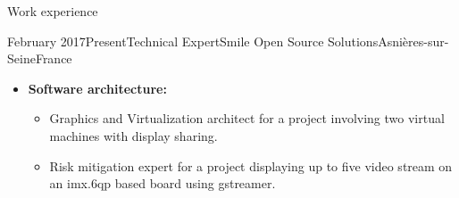 \documentclass[a4paper, 10pt]{article}
\begin{document}
\begin{section} {Work experience}
    \begin{experience}{February 2017}{Present}{Technical Expert}{Smile Open Source Solutions}{Asni\`{e}res-sur-Seine}{France}
    \begin{subexperience}
    \begin{itemize}[parsep=0cm,itemsep=0cm,topsep=0cm]
		\item \textbf {Software architecture:}
		\begin{itemize}[parsep=0cm,itemsep=0cm,topsep=0cm]
		\item Graphics and Virtualization architect for a project involving two virtual machines with display sharing.
		\item Risk mitigation expert for a project displaying up to five video stream on an imx.6qp based board using gstreamer.
		\end{itemize}
	\end{itemize}
	\end{subexperience}
	\end{experience}


\end{section}
\end{document}
